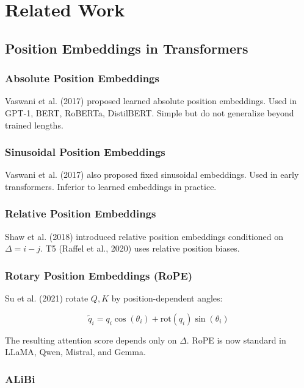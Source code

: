 
\section{Related Work}

\subsection{Position Embeddings in Transformers}

\subsubsection{Absolute Position Embeddings}

Vaswani et al. (2017) proposed learned absolute position embeddings. Used 
in GPT-1, BERT, RoBERTa, DistilBERT. Simple but do not generalize beyond 
trained lengths.

\subsubsection{Sinusoidal Position Embeddings}

Vaswani et al. (2017) also proposed fixed sinusoidal embeddings. Used in 
early transformers. Inferior to learned embeddings in practice.

\subsubsection{Relative Position Embeddings}

Shaw et al. (2018) introduced relative position embeddings conditioned on 
$\Delta = i - j$. T5 (Raffel et al., 2020) uses relative position biases.

\subsubsection{Rotary Position Embeddings (RoPE)}

Su et al. (2021) rotate $Q, K$ by position-dependent angles:

\[
\tilde{q}_i = q_i \cos(\theta_i) + \mathrm{rot}(q_i) \sin(\theta_i)
\tag{2.1}
\]

The resulting attention score depends only on $\Delta$. RoPE is now 
standard in LLaMA, Qwen, Mistral, and Gemma.

\subsubsection{ALiBi}

